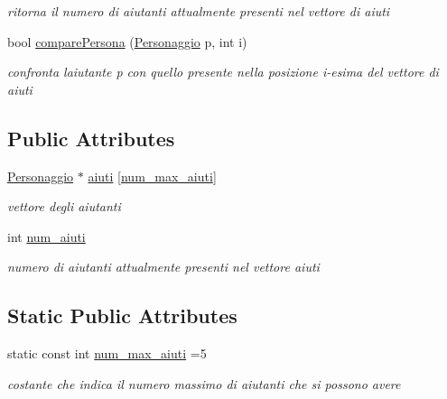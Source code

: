 \begin{DoxyCompactItemize}
\begin{DoxyCompactList}\small\item\em ritorna il numero di aiutanti attualmente presenti nel vettore di aiuti \end{DoxyCompactList}\item 
bool \hyperlink{classGiocatore_acb3e7fc5a268671fb5d2628610a91040}{compare\+Persona} (\hyperlink{classPersonaggio}{Personaggio} p, int i)
\begin{DoxyCompactList}\small\item\em confronta l\textquotesingle{}aiutante p con quello presente nella posizione i-\/esima del vettore di aiuti \end{DoxyCompactList}\end{DoxyCompactItemize}
\subsection*{Public Attributes}
\begin{DoxyCompactItemize}
\item 
\hypertarget{classGiocatore_a051497cae381d27b07def9e89231bf6d}{}\hyperlink{classPersonaggio}{Personaggio} $\ast$ \hyperlink{classGiocatore_a051497cae381d27b07def9e89231bf6d}{aiuti} \mbox{[}\hyperlink{classGiocatore_afb448871b667ab644a2a32a0ade42e39}{num\+\_\+max\+\_\+aiuti}\mbox{]}\label{classGiocatore_a051497cae381d27b07def9e89231bf6d}

\begin{DoxyCompactList}\small\item\em vettore degli aiutanti \end{DoxyCompactList}\item 
\hypertarget{classGiocatore_a8c7c227c90ed564f4e370c790cbef97d}{}int \hyperlink{classGiocatore_a8c7c227c90ed564f4e370c790cbef97d}{num\+\_\+aiuti}\label{classGiocatore_a8c7c227c90ed564f4e370c790cbef97d}

\begin{DoxyCompactList}\small\item\em numero di aiutanti attualmente presenti nel vettore aiuti \end{DoxyCompactList}\end{DoxyCompactItemize}
\subsection*{Static Public Attributes}
\begin{DoxyCompactItemize}
\item 
\hypertarget{classGiocatore_afb448871b667ab644a2a32a0ade42e39}{}static const int \hyperlink{classGiocatore_afb448871b667ab644a2a32a0ade42e39}{num\+\_\+max\+\_\+aiuti} =5\label{classGiocatore_afb448871b667ab644a2a32a0ade42e39}

\begin{DoxyCompactList}\small\item\em costante che indica il numero massimo di aiutanti che si possono avere \end{DoxyCompactList}\end{DoxyCompactItemize}
